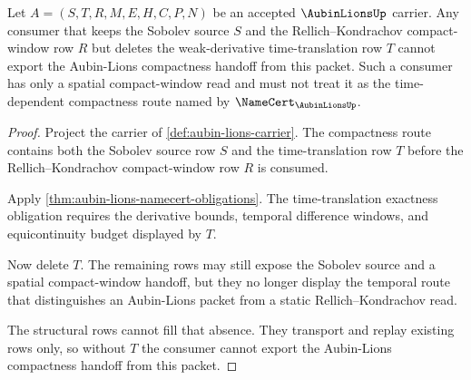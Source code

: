 \begin{theorem}
\label{thm:aubin-lions-time-translation-nonescape}
Let $A=(S,T,R,M,E,H,C,P,N)$ be an accepted $\AubinLionsUp$ carrier. Any consumer that keeps the Sobolev source $S$ and the Rellich--Kondrachov compact-window row $R$ but deletes the weak-derivative time-translation row $T$ cannot export the Aubin-Lions compactness handoff from this packet. Such a consumer has only a spatial compact-window read and must not treat it as the time-dependent compactness route named by $\NameCert_{\AubinLionsUp}$.
\end{theorem}
\begin{proof}
Project the carrier of \autoref{def:aubin-lions-carrier}. The compactness route contains both the Sobolev source row $S$ and the time-translation row $T$ before the Rellich--Kondrachov compact-window row $R$ is consumed.

Apply \autoref{thm:aubin-lions-namecert-obligations}. The time-translation exactness obligation requires the derivative bounds, temporal difference windows, and equicontinuity budget displayed by $T$.

Now delete $T$. The remaining rows may still expose the Sobolev source and a spatial compact-window handoff, but they no longer display the temporal route that distinguishes an Aubin-Lions packet from a static Rellich--Kondrachov read.

The structural rows cannot fill that absence. They transport and replay existing rows only, so without $T$ the consumer cannot export the Aubin-Lions compactness handoff from this packet.
\end{proof}




